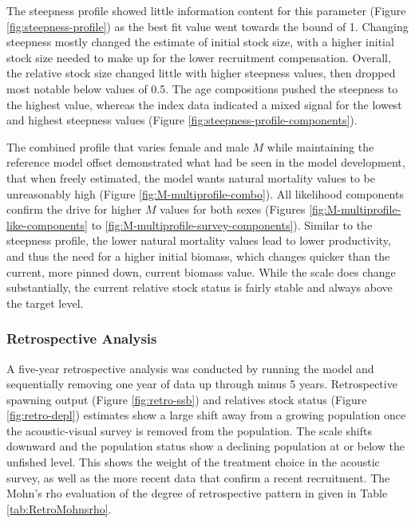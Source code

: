\documentclass[11pt,
  english,
  letterpaper,
]{article}
\begin{document}
The steepness profile showed little information content for this parameter (Figure \ref{fig:steepness-profile}) as the best fit value went towards the bound of 1. Changing steepness mostly changed the estimate of initial stock size, with a higher initial stock size needed to make up for the lower recruitment compensation. Overall, the relative stock size changed little with higher steepness values, then dropped most notable below values of 0.5. The age compositions pushed the steepness to the highest value, whereas the index data indicated a mixed signal for the lowest and highest steepness values (Figure \ref{fig:steepness-profile-components}).

The combined profile that varies female and male \(M\) while maintaining the reference model offset demonstrated what had be seen in the model development, that when freely estimated, the model wants natural mortality values to be unreasonably high (Figure \ref{fig:M-multiprofile-combo}). All likelihood components confirm the drive for higher \(M\) values for both sexes (Figures \ref{fig:M-multiprofile-like-components} to \ref{fig:M-multiprofile-survey-components}). Similar to the steepness profile, the lower natural mortality values lead to lower productivity, and thus the need for a higher initial biomass, which changes quicker than the current, more pinned down, current biomass value. While the scale does change substantially, the current relative stock status is fairly stable and always above the target level.

\hypertarget{retrospective-analysis}{%
\subsubsection{Retrospective Analysis}\label{retrospective-analysis}}

A five-year retrospective analysis was conducted by running the model and sequentially removing one year of data up through minus 5 years. Retrospective spawning output (Figure \ref{fig:retro-ssb}) and relatives stock status (Figure \ref{fig:retro-depl}) estimates show a large shift away from a growing population once the acoustic-visual survey is removed from the population. The scale shifts downward and the population status show a declining population at or below the unfished level. This shows the weight of the treatment choice in the acoustic survey, as well as the more recent data that confirm a recent recruitment. The Mohn's rho evaluation of the degree of retrospective pattern in given in Table \ref{tab:RetroMohnsrho}.
\end{document}

